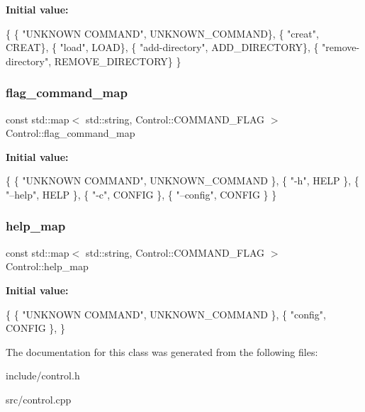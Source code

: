 {\bfseries Initial value\+:}
\begin{DoxyCode}
\{
    \{ \textcolor{stringliteral}{"UNKNOWN COMMAND"}, UNKNOWN\_COMMAND\},
    \{ \textcolor{stringliteral}{"creat"}, CREAT\},
    \{ \textcolor{stringliteral}{"load"}, LOAD\},
    \{ \textcolor{stringliteral}{"add-directory"}, ADD\_DIRECTORY\},
    \{ \textcolor{stringliteral}{"remove-directory"}, REMOVE\_DIRECTORY\}
\}
\end{DoxyCode}
\mbox{\label{class_control_a86f2b547b8d8570c48a662fd5b0fa654}} 
\subsubsection{\texorpdfstring{flag\+\_\+command\+\_\+map}{flag\_command\_map}}
{\footnotesize\ttfamily const std\+::map$<$ std\+::string, Control\+::\+C\+O\+M\+M\+A\+N\+D\+\_\+\+F\+L\+AG $>$ Control\+::flag\+\_\+command\+\_\+map\hspace{0.3cm}{\ttfamily [static]}}

{\bfseries Initial value\+:}
\begin{DoxyCode}
\{
    \{ \textcolor{stringliteral}{"UNKNOWN COMMAND"}, UNKNOWN\_COMMAND \},
    \{ \textcolor{stringliteral}{"-h"}, HELP \},
    \{ \textcolor{stringliteral}{"--help"}, HELP \},
    \{ \textcolor{stringliteral}{"-c"}, CONFIG \},
    \{ \textcolor{stringliteral}{"--config"}, CONFIG \}
\}
\end{DoxyCode}
\mbox{\label{class_control_af187d3163a4d5486567324b24897d752}} 
\subsubsection{\texorpdfstring{help\+\_\+map}{help\_map}}
{\footnotesize\ttfamily const std\+::map$<$ std\+::string, Control\+::\+C\+O\+M\+M\+A\+N\+D\+\_\+\+F\+L\+AG $>$ Control\+::help\+\_\+map\hspace{0.3cm}{\ttfamily [static]}}

{\bfseries Initial value\+:}
\begin{DoxyCode}
\{
    \{ \textcolor{stringliteral}{"UNKNOWN COMMAND"}, UNKNOWN\_COMMAND \},
    \{ \textcolor{stringliteral}{"config"}, CONFIG \},
\}
\end{DoxyCode}


The documentation for this class was generated from the following files\+:\begin{DoxyCompactItemize}
\item 
include/control.\+h\item 
src/control.\+cpp\end{DoxyCompactItemize}
